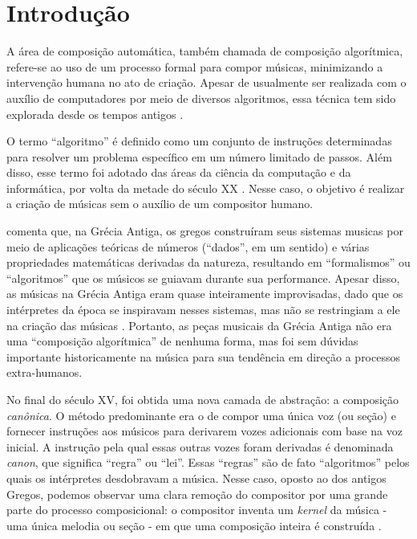 \documentclass{automatextcc}
\begin{document}
\listoftables


\chapter{Introdução}

A área de composição automática, também chamada de composição algorítmica, refere-se ao uso de um processo formal para compor músicas, minimizando a intervenção humana no ato de criação. Apesar de usualmente ser realizada com o auxílio de computadores por meio de diversos algoritmos, essa técnica tem sido explorada desde os tempos antigos \citep{grout1996}.

O termo ``algoritmo'' é definido como um conjunto de instruções determinadas para resolver um problema específico em um número limitado de passos. Além disso, esse termo foi adotado das áreas da ciência da computação e da informática, por volta da metade do século XX \citep{burns1997}. Nesse caso, o objetivo é realizar a criação de músicas sem o auxílio de um compositor humano.

\cite{grout1996} comenta que, na Grécia Antiga, os gregos construíram seus sistemas musicas por meio de aplicações teóricas de números (``dados'', em um sentido) e várias propriedades matemáticas derivadas da natureza, resultando em ``formalismos'' ou ``algoritmos'' que os músicos se guiavam durante sua performance. Apesar disso, as músicas na Grécia Antiga eram quase inteiramente improvisadas, dado que os intérpretes da época se inspiravam nesses sistemas, mas não se restringiam a ele na criação das músicas \citep{grout1996}. Portanto, as peças musicais da Grécia Antiga não era uma ``composição algorítmica'' de nenhuma forma, mas foi sem dúvidas importante historicamente na música para sua tendência em direção a processos extra-humanos.

No final do século XV, foi obtida uma nova camada de abstração: a composição \textit{canônica}. O método predominante era o de compor uma única voz (ou seção) e fornecer instruções aos músicos para derivarem vozes adicionais com base na voz inicial. A instrução pela qual essas outras vozes foram derivadas é denominada \textit{canon}, que significa ``regra'' ou ``lei''. Essas ``regras'' são de fato ``algoritmos'' pelos quais os intérpretes desdobravam a música. Nesse caso, oposto ao dos antigos Gregos, podemos observar uma clara remoção do compositor por uma grande parte do processo composicional: o compositor inventa um \textit{kernel} da música - uma única melodia ou seção - em que uma composição inteira é construída \citep{grout1996}. %
\end{document}
